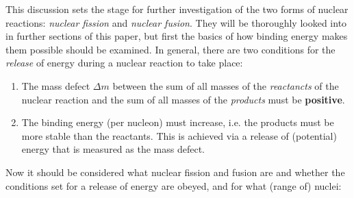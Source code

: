 This discussion sets the stage for further investigation of the two forms of nuclear reactions: \emph{nuclear fission} and \emph{nuclear fusion}. They will be thoroughly looked into in further sections of this paper, but first the basics of how binding energy makes them possible should be examined. In general, there are two conditions for the \emph{release} of energy during a nuclear reaction to take place:

\begin{enumerate}
	
	\item The mass defect $\Delta m$ between the sum of all masses of the 
	\emph{reactancts} of the nuclear reaction and the sum of all masses of the 
	\emph{products} must be \textbf{positive}.

	\item The binding energy (per nucleon) must increase, i.e. the products must be more stable than the reactants. This is achieved via a release of (potential) energy that is measured as the mass defect.

\end{enumerate}

Now it should be considered what nuclear fission and fusion are and whether the conditions set for a release of energy are obeyed, and for what (range of) nuclei:

